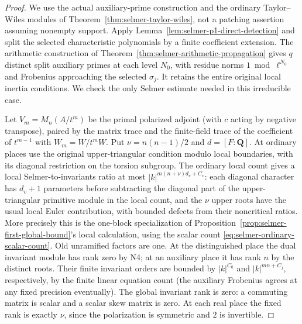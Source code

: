 \begin{proof}
We use the actual auxiliary-prime construction and the ordinary
Taylor--Wiles modules of
Theorem~\ref{thm:selmer-taylor-wiles}, not a patching assertion
assuming nonempty support. Apply Lemma~\ref{lem:selmer-p1-direct-detection}
and split the selected characteristic polynomials by a finite
coefficient extension. The arithmetic construction of
Theorem~\ref{thm:selmer-arithmetic-propagation} gives $q$ distinct
split auxiliary primes at each level $N_0$, with residue norms
$1\bmod\ell^{N_0}$ and Frobenius approaching the selected
$\sigma_j$. It retains the entire original local inertia
conditions. We check the only Selmer estimate needed in this
irreducible case.

Let $V_m=M_n(A/t^m)$ be the primal polarized adjoint
(with $c$ acting by negative transpose), paired by the matrix
trace and the finite-field trace of the coefficient of $t^{m-1}$
with $W_m=W/t^mW$. Put $\nu=n(n-1)/2$ and $d=[F:\mathbf Q]$.
At ordinary places use the original upper-triangular condition
modulo local boundaries, with its diagonal restriction on the
torsion subgroup. The ordinary local count gives a local
Selmer-to-invariants ratio at most
$|k|^{m(n+\nu)d_v+C_v}$:
each diagonal character has $d_v+1$ parameters before
subtracting the diagonal part of the upper-triangular primitive
module in the local count, and the $\nu$ upper roots have the usual
local Euler contribution,
with bounded defects from their noncritical ratios. More precisely
this is the one-block specialization of
Proposition~\ref{prop:selmer-first-global-bound}'s local
calculation, using the scalar count
\eqref{eq:selmer-ordinary-scalar-count}.
Old unramified factors are one. At the distinguished place
the dual invariant module has rank zero by N4; at an auxiliary
place it has rank $n$ by the distinct roots. Their finite
invariant orders are bounded by $|k|^{C_0}$ and
$|k|^{mn+C_j}$, respectively, by the finite linear equation
count (the auxiliary Frobenius agrees at any fixed precision
eventually). The global invariant rank is zero: a commuting
matrix is scalar and a scalar skew matrix is zero. At each
real place the fixed rank is exactly $\nu$, since the
polarization is symmetric and $2$ is invertible.


\end{proof}
